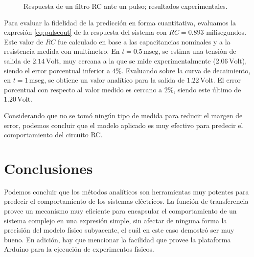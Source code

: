 \documentclass[parskip]{scrartcl}
\begin{document}
\begin{figure}[h!]
\centering
{}
\caption{Respuesta de un filtro RC ante un pulso; resultados experimentales.}
\label{fig:rcresponseempiric}
\end{figure}

Para evaluar la fidelidad de la predicción en forma cuantitativa, evaluamos la expresión \eqref{eq:pulseout} de la respuesta del sistema con $RC = 0.893$ milisegundos. Este valor de $RC$ fue calculado en base a las capacitancias nominales y a la resistencia medida con multímetro. En $t = 0.5\,\mathrm{mseg}$, se estima una tensión de salida de $2.14\,\mathrm{Volt}$, muy cercana a la que se mide experimentalmente ($2.06\,\mathrm{Volt}$), siendo el error porcentual inferior a $4$\%. Evaluando sobre la curva de decaimiento, en $t = 1\,\mathrm{mseg}$, se obtiene un valor analítico para la salida de $1.22\,\mathrm{Volt}$. El error porcentual con respecto al valor medido es cercano a $2$\%, siendo este último de $1.20\,\mathrm{Volt}$.

Considerando que no se tomó ningún tipo de medida para reducir el margen de error, podemos concluir que el modelo aplicado es muy efectivo para predecir el comportamiento del circuito RC.

\section{Conclusiones}

Podemos concluir que los métodos analíticos son herramientas muy potentes para predecir el comportamiento de los sistemas eléctricos. La función de transferencia provee un mecanismo muy eficiente para encapsular el comportamiento de un sistema complejo en una expresión simple, sin afectar de ninguna forma la precisión del modelo físico subyacente, el cuál en este caso demostró ser muy bueno. En adición, hay que mencionar la facilidad que provee la plataforma Arduino para la ejecución de experimentos físicos.
\end{document}
